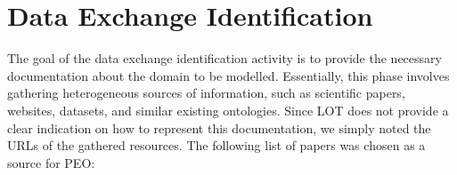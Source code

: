 \section{Data Exchange Identification}
The goal of the data exchange identification activity is to provide the necessary documentation about the domain to be modelled.
Essentially, this phase involves gathering heterogeneous sources of information, such as scientific papers, websites, datasets, and similar existing ontologies.
Since LOT does not provide a clear indication on how to represent this documentation, we simply noted the URLs of the gathered resources.
The following list of papers was chosen as a source for PEO:

